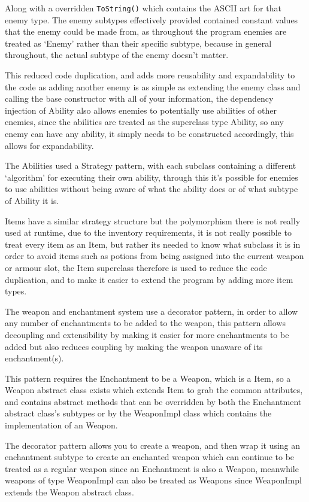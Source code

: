 \documentclass[12pt,titlepage]{article}
\begin{document}
Along with a overridden \texttt{ToString()} which contains the ASCII art for that enemy type. The enemy subtypes effectively provided contained constant values that the enemy could be made from, as throughout the program enemies are treated as `Enemy' rather than their specific subtype, because in general throughout, the actual subtype of the enemy doesn't matter.

This reduced code duplication, and adds more reusability and expandability to the code as adding another enemy is as simple as extending the enemy class and calling the base constructor with all of your information, the dependency injection of Ability also allows enemies to potentially use abilities of other enemies, since the abilities are treated as the superclass type Ability, so any enemy can have any ability, it simply needs to be constructed accordingly, this allows for expandability.

The Abilities used a Strategy pattern, with each subclass containing a different `algorithm' for executing their own ability, through this it's possible for enemies to use abilities without being aware of what the ability does or of what subtype of Ability it is.

Items have a similar strategy structure but the polymorphism there is not really used at runtime, due to the inventory requirements, it is not really possible to treat every item as an Item, but rather its needed to know what subclass it is in order to avoid items such as potions from being assigned into the current weapon or armour slot, the Item superclass therefore is used to reduce the code duplication, and to make it easier to extend the program by adding more item types.

The weapon and enchantment system use a decorator pattern, in order to allow any number of enchantments to be added to the weapon, this pattern allows decoupling and extensibility by making it easier for more enchantments to be added but also reduces coupling by making the weapon unaware of its enchantment(s).

This pattern requires the Enchantment to be a Weapon, which is a Item, so a Weapon abstract class exists which extends Item to grab the common attributes, and contains abstract methods that can be overridden by both the Enchantment abstract class's subtypes or by the WeaponImpl class which contains the implementation of an Weapon.

The decorator pattern allows you to create a weapon, and then wrap it using an enchantment subtype to create an enchanted weapon which can continue to be treated as a regular weapon since an Enchantment is also a Weapon, meanwhile weapons of type WeaponImpl can also be treated as Weapons since WeaponImpl extends the Weapon abstract class.
\end{document}

